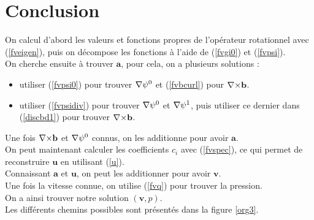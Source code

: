 \section{Conclusion}

On calcul d'abord les valeurs et fonctions propres de l'opérateur rotationnel avec (\ref{fveigen}), puis on décompose les fonctions à l'aide de (\ref{fvgi0}) et (\ref{fvpsi}).\\
On cherche ensuite à trouver $\mathbf{a}$, pour cela, on a plusieurs solutions :
\begin{itemize}
\item utiliser (\ref{fvpsi0}) pour trouver ${\nabla}\psi^0$  et (\ref{fvbcurl}) pour ${\nabla\times} \mathbf{b}$.
\item utiliser (\ref{fvpsidiv}) pour trouver ${\nabla}\psi^0$ et ${\nabla}\psi^1$, puis utiliser ce dernier dans (\ref{discbd1}) pour trouver ${\nabla\times} \mathbf{b}$.
\end{itemize}
Une fois ${\nabla\times} \mathbf{b}$ et ${\nabla}\psi^0$ connus, on les additionne pour avoir $\mathbf{a}$.\\
On peut maintenant calculer les coefficients $c_i$ avec (\ref{fvspec}), ce qui permet de reconstruire $\mathbf{u}$ en utilisant (\ref{u}).\\
Connaissant $\mathbf{a}$ et $\mathbf{u}$, on peut les additionner pour avoir $\mathbf{v}$.\\
Une fois la vitesse connue, on utilise (\ref{fvq}) pour trouver la pression.\\

On a ainsi trouver notre solution $(\mathbf{v},p)$.\\
Les différents chemins possibles sont présentés dans la figure \ref{org3}.\\


